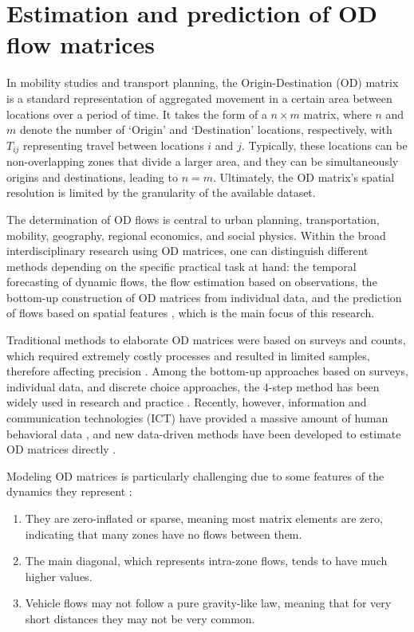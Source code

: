 \section{Estimation and prediction of OD flow matrices}
\label{sub:1.2intro_pred_OD}

In mobility studies and transport planning, the Origin-Destination (OD) matrix is a standard representation of aggregated movement in a certain area between locations over a period of time. It takes the form of a $n \times m$ matrix, where $n$ and $m$ denote the number of `Origin' and `Destination' locations, respectively, with $T_{ij}$ representing travel between locations $i$ and $j$. Typically, these locations can be non-overlapping zones that divide a larger area, and they can be simultaneously origins and destinations, leading to $n = m$. Ultimately, the OD matrix's spatial resolution is limited by the granularity of the available dataset. 

The determination of OD flows is central to urban planning, transportation, mobility, geography, regional economics, and social physics. Within the broad interdisciplinary research using OD matrices, one can distinguish different methods depending on the specific practical task at hand: the temporal forecasting of dynamic flows, the flow estimation based on observations, the bottom-up construction of OD matrices from individual data, and the prediction of flows based on spatial features \citep{Rong2023AnTechniques}, which is the main focus of this research.

Traditional methods to elaborate OD matrices were based on surveys and counts, which required extremely costly processes and resulted in limited samples, therefore affecting precision \citep{Axhausen2002ObservingDiary, Iqbal2014DevelopmentData, Schuessler2009ProcessingInformation}.  Among the bottom-up approaches based on surveys, individual data, and discrete choice approaches, the 4-step method has been widely used in research and practice \citep{McNally2007TheModel, Ortuzar2011ModellingTransport}. Recently, however, information and communication technologies (ICT) have provided a massive amount of human behavioral data \citep{Lenormand2015InfluenceMobility}, and new data-driven methods have been developed to estimate OD matrices directly \citep{Caceres2008ReviewNetworks}.

Modeling OD matrices is particularly challenging due to some features of the dynamics they represent  \citep{Thomas-Agnan2021SpatialModels}:
\begin{enumerate}
    \item They are zero-inflated or sparse, meaning most matrix elements are zero, indicating that many zones have no flows between them.
    \item The main diagonal, which represents intra-zone flows, tends to have much higher values.
    \item Vehicle flows may not follow a pure gravity-like law, meaning that for very short distances they may not be very common.
\end{enumerate}

